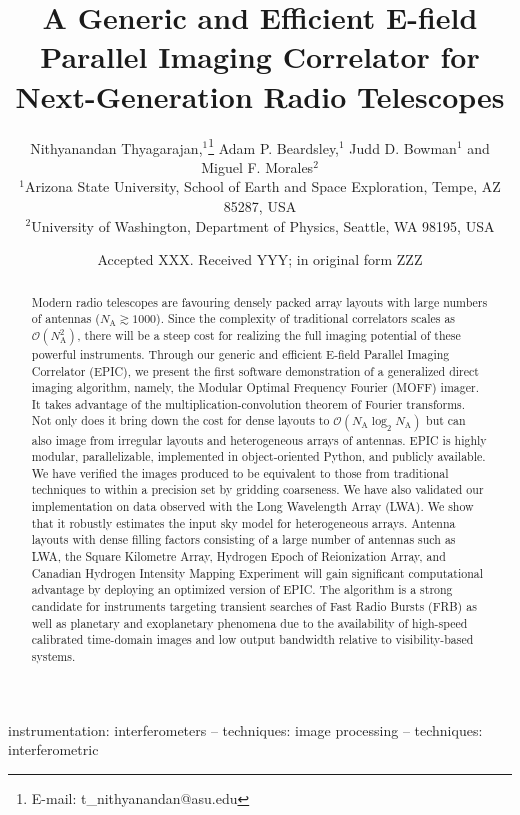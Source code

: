 \documentclass[a4paper,fleqn,usenatbib]{mnras}
\title[E-field Parallel Imaging Correlator]{A Generic and Efficient E-field Parallel Imaging Correlator for Next-Generation Radio Telescopes}
\author[Thyagarajan et al.]{
Nithyanandan Thyagarajan,$^{1}$\thanks{E-mail: t\_nithyanandan@asu.edu}
Adam P. Beardsley,$^{1}$
Judd D. Bowman$^{1}$
\newauthor
and Miguel F. Morales$^{2}$
\\
$^{1}$Arizona State University, School of Earth and Space Exploration, Tempe, AZ 85287, USA\\
$^{2}$University of Washington, Department of Physics, Seattle, WA 98195, USA\\
}
\date{Accepted XXX. Received YYY; in original form ZZZ}
\newcommand{\Nant}{N_\textrm{A}}
\begin{document}
\label{firstpage}
\pagerange{\pageref{firstpage}--\pageref{lastpage}}
\maketitle

\begin{abstract}
Modern radio telescopes are favouring densely packed array layouts with large numbers of antennas ($\Nant\gtrsim 1000$). Since the complexity of traditional correlators scales as $\mathcal{O}(\Nant^2)$, there will be a steep cost for realizing the full imaging potential of these powerful instruments. Through our generic and efficient E-field Parallel Imaging Correlator (EPIC), we present the first software demonstration of a generalized direct imaging algorithm, namely, the Modular Optimal Frequency Fourier (MOFF) imager. It takes advantage of the multiplication-convolution theorem of Fourier transforms. Not only does it bring down the cost for dense layouts to $\mathcal{O}(\Nant\log_2\Nant)$ but can also image from irregular layouts and heterogeneous arrays of antennas. EPIC is highly modular, parallelizable, implemented in object-oriented Python, and publicly available. We have verified the images produced to be equivalent to those from traditional techniques to within a precision set by gridding coarseness. We have also validated our implementation on data observed with the Long Wavelength Array (LWA). We show that it robustly estimates the input sky model for heterogeneous arrays. Antenna layouts with dense filling factors consisting of a large number of antennas such as LWA, the Square Kilometre Array, Hydrogen Epoch of Reionization Array, and Canadian Hydrogen Intensity Mapping Experiment will gain significant computational advantage by deploying an optimized version of EPIC. The algorithm is a strong candidate for instruments targeting transient searches of Fast Radio Bursts (FRB) as well as planetary and exoplanetary phenomena due to the availability of high-speed calibrated time-domain images and low output bandwidth relative to visibility-based systems.
\end{abstract}

\begin{keywords}
instrumentation: interferometers -- techniques: image processing -- techniques: interferometric
\end{keywords}
\end{document}
